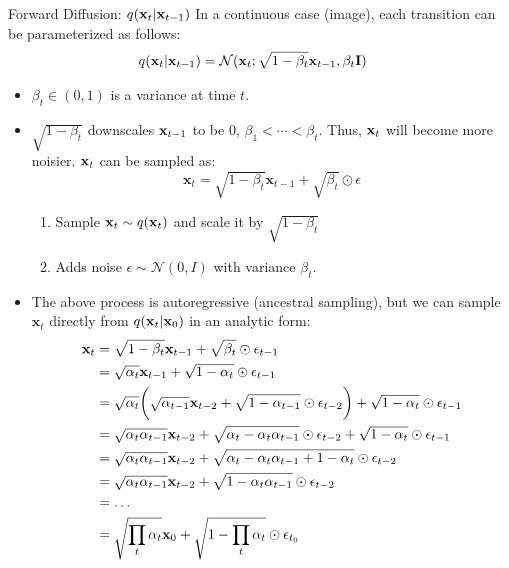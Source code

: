 Forward Diffusion: $q({\mathbf{x}}_t \vert {\mathbf{x}}_{t-1})$
	In a continuous case (\eg image), each transition can be parameterized as follows:
\begin{align}
	q({\mathbf{x}}_t \vert {\mathbf{x}}_{t-1}) &= \mathcal{N}(\mathbf{x}_t; \sqrt{1 - \beta_t} {\mathbf{x}}_{t-1}, \beta_t\mathbf{I})
	\label{eq:forward_diffusion}
\end{align}
\begin{itemize}
		\item $\beta_t\in (0,1)$ is a variance at time $t$.
		\item $\sqrt{1 - \beta_t}$ downscales ${\mathbf{x}}_{t-1}$ to be 0, $\beta_1<\cdots<\beta_t$. Thus, ${\mathbf{x}}_t$ will become more noisier. ${\mathbf{x}}_t$ can be sampled as:
			$$\mathbf{x}_t= \sqrt{1 - \beta_t} \mathbf{x}_{t-1}+ \sqrt{\beta_t} \odot \epsilon$$
			\begin{enumerate}
				\item Sample ${\mathbf{x}}_{t}\sim q({\mathbf{x}}_t)$ and scale it by $\sqrt{1 - \beta_t}$
				\item Adds noise $\epsilon\sim \mathcal{N}(0,I)$ with variance $\beta_t$.
			\end{enumerate}
		\item The above process is autoregressive (\ie ancestral sampling), but we can sample $\mathbf{x}_t$ directly from $q(\mathbf{x}_t|{\mathbf{x}}_0)$ in an analytic form:
\begin{align}
	\rvx_t &= \sqrt{1 - \beta_t} \mathbf{x}_{t-1}+ \sqrt{\beta_t} \odot \epsilon_{t-1}\\
						   &= \sqrt{\alpha_t} \mathbf{x}_{t-1}+ \sqrt{1-\alpha_t} \odot \epsilon_{t-1}\\
						   &= \sqrt{\alpha_t} \bigg(\sqrt{\alpha_{t-1}} \mathbf{x}_{t-2}+ \sqrt{1-\alpha_{t-1}} \odot \epsilon_{t-2}\bigg) + \sqrt{1-\alpha_t} \odot \epsilon_{t-1}\\
						   &= \sqrt{\alpha_t\alpha_{t-1}} \mathbf{x}_{t-2} + \sqrt{\alpha_t-\alpha_t\alpha_{t-1}} \odot \epsilon_{t-2} + \sqrt{1-\alpha_t} \odot \epsilon_{t-1}\\
						   &= \sqrt{\alpha_t\alpha_{t-1}} \mathbf{x}_{t-2} + \sqrt{\alpha_t-\alpha_t\alpha_{t-1}+1-\alpha_t} \odot \epsilon_{t-2} \\
						   &= \sqrt{\alpha_t\alpha_{t-1}} \mathbf{x}_{t-2} + \sqrt{1-\alpha_t\alpha_{t-1}} \odot \epsilon_{t-2} \\
						   &= \dots\\
						   &= \sqrt{\prod_{t}\alpha_t} \mathbf{x}_{0} + \sqrt{1-\prod_t \alpha_t} \odot \epsilon_{t_0} \\

\end{align}
\end{itemize}
